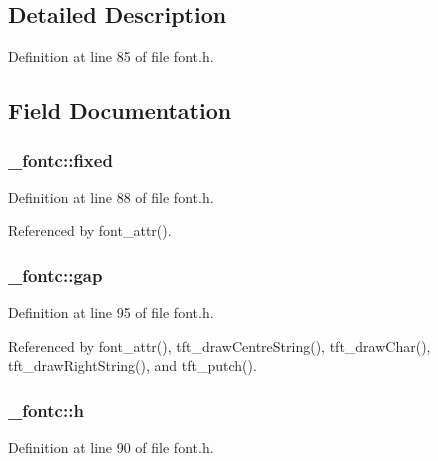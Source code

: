 \subsection{Detailed Description}


Definition at line 85 of file font.\-h.



\subsection{Field Documentation}
\hypertarget{struct__fontc_aec700f6ada95d1bced81fc2728633878}{
\subsubsection[{fixed}]{ \-\_\-fontc\-::fixed}}\label{struct__fontc_aec700f6ada95d1bced81fc2728633878}


Definition at line 88 of file font.\-h.



Referenced by font\-\_\-attr().

\hypertarget{struct__fontc_a38c23e7e200346fce3777d4efa30488f}{
\subsubsection[{gap}]{ \-\_\-fontc\-::gap}}\label{struct__fontc_a38c23e7e200346fce3777d4efa30488f}


Definition at line 95 of file font.\-h.



Referenced by font\-\_\-attr(), tft\-\_\-draw\-Centre\-String(), tft\-\_\-draw\-Char(), tft\-\_\-draw\-Right\-String(), and tft\-\_\-putch().

\hypertarget{struct__fontc_a9feb8c838dfc1d4eebb15c8e53981944}{
\subsubsection[{h}]{ \-\_\-fontc\-::h}}\label{struct__fontc_a9feb8c838dfc1d4eebb15c8e53981944}


Definition at line 90 of file font.\-h.



